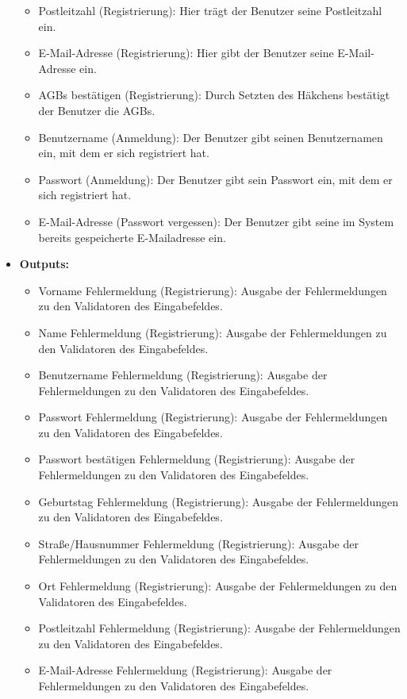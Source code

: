 \begin{itemize}
\begin{itemize}
							\item Postleitzahl (Registrierung): Hier trägt der Benutzer seine Postleitzahl ein.
							\item E-Mail-Adresse (Registrierung): Hier gibt der Benutzer seine E-Mail-Adresse ein.
							\item AGBs bestätigen (Registrierung): Durch Setzten des Häkchens bestätigt der Benutzer die AGBs. 
							\item Benutzername (Anmeldung): Der Benutzer gibt seinen Benutzernamen ein, mit dem er sich registriert hat.
							\item Passwort (Anmeldung): Der Benutzer gibt sein Passwort ein, mit dem er sich registriert hat.
							\item E-Mail-Adresse (Passwort vergessen): Der Benutzer gibt seine im System bereits gespeicherte E-Mailadresse ein.
						\end{itemize}
					\item \textbf{Outputs:} 
						\begin{itemize}
							\item Vorname Fehlermeldung (Registrierung): Ausgabe der Fehlermeldungen zu den Validatoren des Eingabefeldes.
							\item Name Fehlermeldung (Registrierung): Ausgabe der Fehlermeldungen zu den Validatoren des Eingabefeldes.
							\item Benutzername Fehlermeldung (Registrierung): Ausgabe der Fehlermeldungen zu den Validatoren des Eingabefeldes.
							\item Passwort Fehlermeldung (Registrierung): Ausgabe der Fehlermeldungen zu den Validatoren des Eingabefeldes.
							\item Passwort bestätigen Fehlermeldung (Registrierung): Ausgabe der Fehlermeldungen zu den Validatoren des Eingabefeldes.
							\item Geburtstag Fehlermeldung (Registrierung): Ausgabe der Fehlermeldungen zu den Validatoren des Eingabefeldes.
							\item Straße/Hausnummer Fehlermeldung (Registrierung): Ausgabe der Fehlermeldungen zu den Validatoren des Eingabefeldes.
							\item Ort Fehlermeldung (Registrierung): Ausgabe der Fehlermeldungen zu den Validatoren des Eingabefeldes.
							\item Postleitzahl Fehlermeldung (Registrierung): Ausgabe der Fehlermeldungen zu den Validatoren des Eingabefeldes.
							\item E-Mail-Adresse Fehlermeldung (Registrierung): Ausgabe der Fehlermeldungen zu den Validatoren des Eingabefeldes.

\end{itemize}
\end{itemize}
